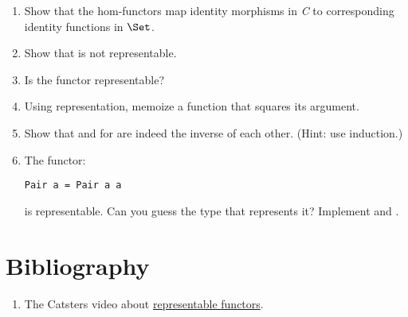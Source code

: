 \begin{enumerate}
\tightlist
\item
  Show that the hom-functors map identity morphisms in \emph{C} to
  corresponding identity functions in $\Set$.
\item
  Show that  is not representable.
\item
  Is the  functor representable?
\item
  Using  representation, memoize a function that squares
  its argument.
\item
  Show that  and  for  are
  indeed the inverse of each other. (Hint: use induction.)
\item
  The functor:

\begin{Verbatim}[commandchars=\\\{\}]
Pair a = Pair a a
\end{Verbatim}
  is representable. Can you guess the type that represents it? Implement
   and .
\end{enumerate}

\section{Bibliography}\label{bibliography}

\begin{enumerate}
\tightlist
\item
  The Catsters video about
  \href{https://www.youtube.com/watch?v=4QgjKUzyrhM}{representable
  functors}.
\end{enumerate}